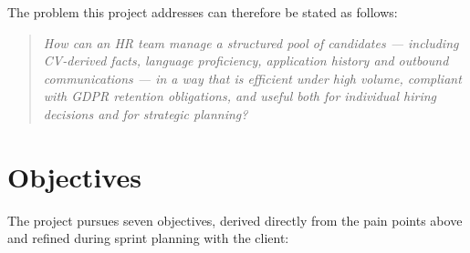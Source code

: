 The problem this project addresses can therefore be stated as follows:

\begin{quote}
\textit{How can an HR team manage a structured pool of candidates --- including
CV-derived facts, language proficiency, application history and outbound
communications --- in a way that is efficient under high volume, compliant
with GDPR retention obligations, and useful both for individual hiring
decisions and for strategic planning?}
\end{quote}


\section{Objectives}
\label{sec:objectives}

The project pursues seven objectives, derived directly from the pain points
above and refined during sprint planning with the client:

